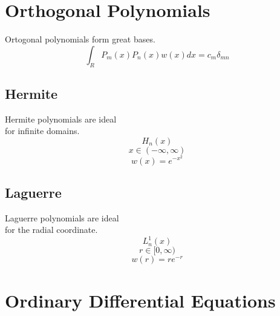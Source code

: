 \documentclass{beamer}
\begin{document}
\section{Orthogonal Polynomials}

\begin{frame}{Ortogonal polynomials form great bases.}
\begin{equation*}
    \int_R P_m(x)P_n(x) w(x)dx = c_m\delta_{mn}
\end{equation*}

\end{frame}

\subsection{Hermite}

\begin{frame}{Hermite polynomials are ideal\\ for infinite domains.}
\begin{equation*}
    H_n(x)
\end{equation*}
\begin{equation*}
    x \in (-\infty, \infty)
\end{equation*}
\begin{equation*}
    w(x) = e^{-x^2}
\end{equation*}


\end{frame}

\subsection{Laguerre}

\begin{frame}{Laguerre polynomials are ideal\\ for the radial coordinate.}
\begin{equation*}
    L_n^{1}(x)
\end{equation*}
\begin{equation*}
    r \in [0, \infty)
\end{equation*}
\begin{equation*}
    w(r) = re^{-r}
\end{equation*}


\end{frame}


\section{Ordinary Differential Equations}
\end{document}

